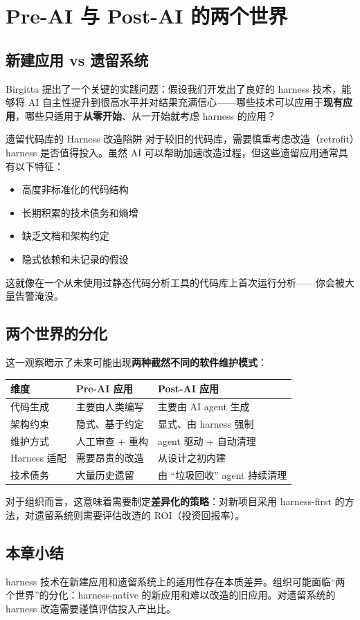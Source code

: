 \section{Pre-AI 与 Post-AI 的两个世界}

\subsection{新建应用 vs 遗留系统}

Birgitta 提出了一个关键的实践问题：假设我们开发出了良好的 harness 技术，能够将 AI 自主性提升到很高水平并对结果充满信心------哪些技术可以应用于\textbf{现有应用}，哪些只适用于\textbf{从零开始}、从一开始就考虑 harness 的应用？

\begin{warningbox}{遗留代码库的 Harness 改造陷阱}
对于较旧的代码库，需要慎重考虑改造（retrofit）harness 是否值得投入。虽然 AI 可以帮助加速改造过程，但这些遗留应用通常具有以下特征：
\begin{itemize}[leftmargin=1.5em]
    \item 高度非标准化的代码结构
    \item 长期积累的技术债务和熵增
    \item 缺乏文档和架构约定
    \item 隐式依赖和未记录的假设
\end{itemize}
这就像在一个从未使用过静态代码分析工具的代码库上首次运行分析------你会被大量告警淹没。
\end{warningbox}

\subsection{两个世界的分化}

这一观察暗示了未来可能出现\textbf{两种截然不同的软件维护模式}：

\begin{table}[H]
\centering
\begin{tabular}{lll}
\toprule
\textbf{维度} & \textbf{Pre-AI 应用} & \textbf{Post-AI 应用} \\
\midrule
代码生成 & 主要由人类编写 & 主要由 AI agent 生成 \\
架构约束 & 隐式、基于约定 & 显式、由 harness 强制 \\
维护方式 & 人工审查 + 重构 & agent 驱动 + 自动清理 \\
Harness 适配 & 需要昂贵的改造 & 从设计之初内建 \\
技术债务 & 大量历史遗留 & 由 ``垃圾回收'' agent 持续清理 \\
\bottomrule
\end{tabular}
\end{table}

对于组织而言，这意味着需要制定\textbf{差异化的策略}：对新项目采用 harness-first 的方法，对遗留系统则需要评估改造的 ROI（投资回报率）。

\subsection{本章小结}

harness 技术在新建应用和遗留系统上的适用性存在本质差异。组织可能面临``两个世界''的分化：harness-native 的新应用和难以改造的旧应用。对遗留系统的 harness 改造需要谨慎评估投入产出比。

\newpage

